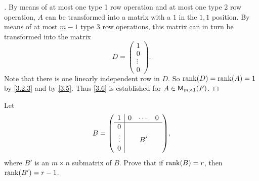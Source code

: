 \begin{proof}[]
	By means of at most one type 1 row operation and at most one type 2 row operation, \(A\) can be transformed into a matrix with a \(1\) in the \(1,1\) position.
	By means of at most \(m - 1\) type 3 row operations, this matrix can in turn be transformed into the matrix
	\[
		D = \begin{pmatrix}
			1      \\
			0      \\
			\vdots \\
			0
		\end{pmatrix}.
	\]
	Note that there is one linearly independent row in \(D\).
	So \(\rk{D} = \rk{A} = 1\) by \cref{3.2.3} and by \cref{3.5}.
	Thus \cref{3.6} is established for \(A \in \ms[m][1][\F]\).
\end{proof}

\begin{ex}\label{ex:3.2.11}
	Let
	\[
		B = \pa{\begin{array}{c|ccc}
				1      & 0 & \cdots & 0 \\
				\hline
				0      &   &        &   \\
				\vdots &   & B'     &   \\
				0      &   &        &
			\end{array}},
	\]
	where \(B'\) is an \(m \times n\) submatrix of \(B\).
	Prove that if \(\rk{B} = r\), then \(\rk{B'} = r - 1\).
\end{ex}

